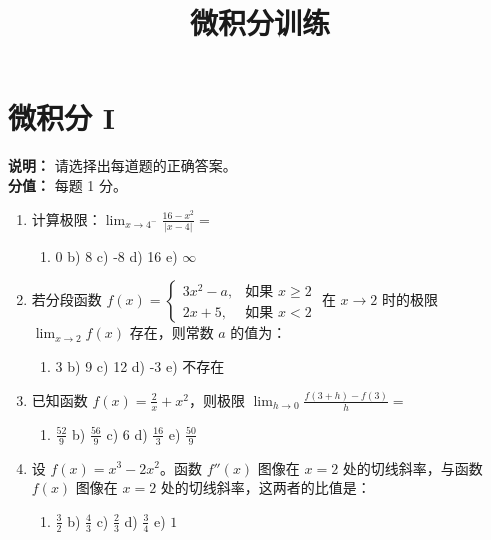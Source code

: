 \documentclass[12pt,a4paper]{article}
\title{\textbf{微积分训练}}
\author{}
\date{}
\begin{document}
\maketitle
\thispagestyle{fancy}

\section*{微积分 I}
\textbf{说明：} 请选择出每道题的正确答案。\\
\textbf{分值：} 每题 1 分。

\begin{enumerate}[label=\arabic*), itemsep=15pt]

    \item 计算极限：$\lim_{x\rightarrow 4^-} \frac{16-x^2}{|x-4|} =$
    \begin{enumerate}[label=\alph*), itemsep=0pt]
        \item 0 \quad b) 8 \quad c) -8 \quad d) 16 \quad e) $\infty$
    \end{enumerate}

    \item 若分段函数 $f(x) = \begin{cases} 3x^2 - a, & \text{如果 } x \ge 2 \\ 2x + 5, & \text{如果 } x < 2 \end{cases}$ 在 $x \to 2$ 时的极限 $\lim_{x\rightarrow 2} f(x)$ 存在，则常数 $a$ 的值为：
    \begin{enumerate}[label=\alph*), itemsep=0pt]
        \item 3 \quad b) 9 \quad c) 12 \quad d) -3 \quad e) 不存在
    \end{enumerate}

    \item 已知函数 $f(x) = \frac{2}{x} + x^2$，则极限 $\lim_{h\rightarrow 0} \frac{f(3+h)-f(3)}{h} =$
    \begin{enumerate}[label=\alph*), itemsep=0pt]
        \item $\frac{52}{9}$ \quad b) $\frac{56}{9}$ \quad c) $6$ \quad d) $\frac{16}{3}$ \quad e) $\frac{50}{9}$
    \end{enumerate}

    \item 设 $f(x) = x^3 - 2x^2$。函数 $f''(x)$ 图像在 $x=2$ 处的切线斜率，与函数 $f(x)$ 图像在 $x=2$ 处的切线斜率，这两者的比值是：
    \begin{enumerate}[label=\alph*), itemsep=0pt]
        \item $\frac{3}{2}$ \quad b) $\frac{4}{3}$ \quad c) $\frac{2}{3}$ \quad d) $\frac{3}{4}$ \quad e) $1$
    \end{enumerate}


\end{enumerate}
\end{document}
